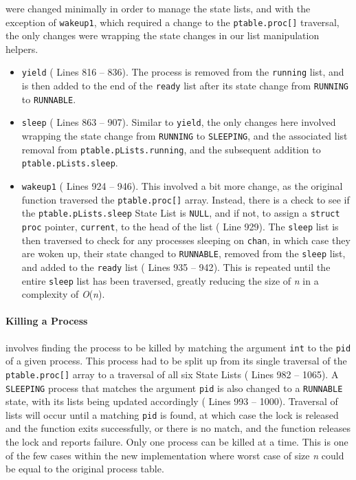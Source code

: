 \documentclass[11pt,letterpaper]{report}
\begin{document}
	were changed minimally in order to manage the state lists, and with the exception of {\tt wakeup1}, which required a change to the {\tt ptable.proc[]} traversal, the only changes were wrapping the state changes in our list manipulation helpers.
	\begin{itemize}
		\item {\tt yield} ({\color{red} Lines 816 -- 836}). The process is removed from the {\tt running} list, and is then added to the end of the {\tt ready} list after its state change from {\tt RUNNING} to {\tt RUNNABLE}.
		\item {\tt sleep} ({\color{red} Lines 863 -- 907}). Similar to {\tt yield}, the only changes here involved wrapping the state change from {\tt RUNNING} to {\tt SLEEPING}, and the associated list removal from {\tt ptable.pLists.running}, and the subsequent addition to {\tt ptable.pLists.sleep}.
		\item {\tt wakeup1} ({\color{red} Lines 924 -- 946}). This involved a bit more change, as the original function traversed the {\tt ptable.proc[]} array. Instead, there is a check to see if the {\tt ptable.pLists.sleep} State List is {\tt NULL}, and if not, to assign a {\tt struct proc} pointer, {\tt current}, to the head of the list ({\color{red} Line 929}). The {\tt sleep} list is then traversed to check for any processes sleeping on {\tt chan}, in which case they are woken up, their state changed to {\tt RUNNABLE}, removed from the {\tt sleep} list, and added to the {\tt ready} list ({\color{red} Lines 935  -- 942}). This is repeated until the entire {\tt sleep} list has been traversed, greatly reducing the size of \emph{n} in a complexity of \emph{O}(\emph{n}).
	\end{itemize}

	\paragraph{Killing a Process}
	
	 involves finding the process to be killed by matching the argument {\tt int} to the {\tt pid} of a given process. This process had to be split up from its single traversal of the {\tt ptable.proc[]} array to a traversal of all six State Lists ({\color{red} Lines 982 -- 1065}). A {\tt SLEEPING} process that matches the argument {\tt pid} is also changed to a {\tt RUNNABLE} state, with its lists being updated accordingly ({\color{red} Lines 993 -- 1000}). Traversal of lists will occur until a matching {\tt pid} is found, at which case the lock is released and the function exits successfully, or there is no match, and the function releases the lock and reports failure. Only one process can be killed at a time. This is one of the few cases within the new implementation where worst case of size \emph{n} could be equal to the original process table.
	 
\end{document}
